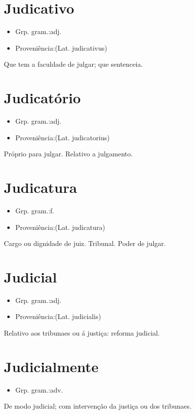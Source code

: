 \documentclass{article}
\begin{document}
\section{Judicativo}
\begin{itemize}
\item {Grp. gram.:adj.}
\end{itemize}
\begin{itemize}
\item {Proveniência:(Lat. \textunderscore judicativus\textunderscore )}
\end{itemize}
Que tem a faculdade de julgar; que sentenceia.
\section{Judicatório}
\begin{itemize}
\item {Grp. gram.:adj.}
\end{itemize}
\begin{itemize}
\item {Proveniência:(Lat. \textunderscore judicatorius\textunderscore )}
\end{itemize}
Próprio para julgar.
Relativo a julgamento.
\section{Judicatura}
\begin{itemize}
\item {Grp. gram.:f.}
\end{itemize}
\begin{itemize}
\item {Proveniência:(Lat. \textunderscore judicatura\textunderscore )}
\end{itemize}
Cargo ou dignidade de juiz.
Tribunal.
Poder de julgar.
\section{Judicial}
\begin{itemize}
\item {Grp. gram.:adj.}
\end{itemize}
\begin{itemize}
\item {Proveniência:(Lat. \textunderscore judicialis\textunderscore )}
\end{itemize}
Relativo aos tribunaes ou á justiça: \textunderscore reforma judicial\textunderscore .
\section{Judicialmente}
\begin{itemize}
\item {Grp. gram.:adv.}
\end{itemize}
De modo judicial; com intervenção da justiça ou dos tribunaes.
\end{document}
